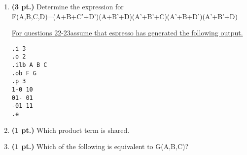 \documentclass{article}
\begin{document}
\begin{enumerate}
\item {\bf (3 pt.)} Determine the \SOPmin expression for \\
F(A,B,C,D)=(A+B+C'+D')(A+B'+D)(A'+B'+C)(A'+B+D')(A'+B'+D)

\pagebreak
\underline{For questions 22-23assume that espresso has generated the following output.}
\begin{verbatim}
.i 3
.o 2
.ilb A B C
.ob F G
.p 3
1-0 10
01- 01
-01 11
.e
\end{verbatim}

\item{\bf (1 pt.)}  Which product term is shared.

\item{\bf (1 pt.)}  Which of the following is equivalent to G(A,B,C)?

\end{enumerate}
\end{document}
